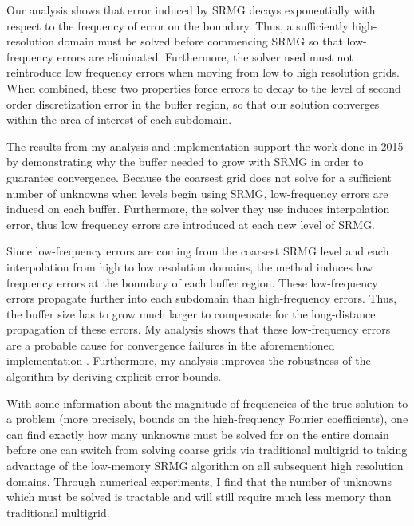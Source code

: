\documentclass[final]{siamart1116}
\numberwithin{theorem}{section}
\begin{document}
    Our analysis shows that error induced by SRMG decays exponentially with respect to the frequency of error on the boundary. Thus, a sufficiently high-resolution domain must be solved before commencing SRMG so that low-frequency errors are eliminated. Furthermore, the solver used must not reintroduce low frequency errors when moving from low to high resolution grids. When combined, these two properties force errors to decay to the level of second order discretization error in the buffer region, so that our solution converges within the area of interest of each subdomain.  
    
   
    
    
    
    The results from my analysis and implementation support the work done in 2015 by demonstrating why the buffer needed to grow with SRMG in order to guarantee convergence. Because the coarsest grid does not solve for a sufficient number of unknowns when levels begin using SRMG, low-frequency errors are induced on each buffer.  Furthermore, the solver they use induces interpolation error, thus low frequency errors are introduced at each new level of SRMG. 
    
    Since low-frequency errors are coming from the coarsest SRMG level and each interpolation from high to low resolution domains, the method induces low frequency errors at the boundary of each buffer region. These low-frequency errors propagate further into each subdomain than high-frequency errors. Thus, the buffer size has to grow much larger to compensate for the long-distance propagation of these errors. My analysis shows that these low-frequency errors are a probable cause for convergence failures in the aforementioned implementation \cite{paper1}. Furthermore, my analysis improves the robustness of the algorithm by deriving explicit error bounds. 
    
    
    With some information about the magnitude of frequencies of the true solution to a problem (more precisely, bounds on the high-frequency Fourier coefficients), one can find exactly how many unknowns must be solved for on the entire domain before one can switch from solving coarse grids via traditional multigrid to taking advantage of the low-memory SRMG algorithm on all subsequent high resolution domains. Through numerical experiments, I find that the number of unknowns which must be solved is tractable and will still require much less memory than traditional multigrid.
    
\end{document}
